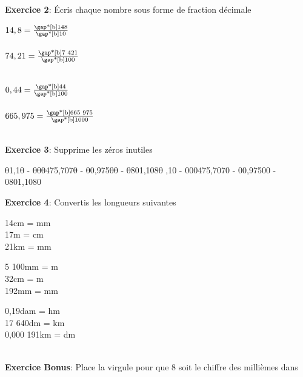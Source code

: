 \documentclass[12pt,a4paper]{article}
\begin{document}
\textbf{Exercice 2}: Écris chaque nombre sous forme de fraction décimale\\

\begin{minipage}{0.5\textwidth}
$14,8 = \frac{\text{\gap*[b]{148}}}{\text{\gap*[b]{10}}}$\\\\
$74,21 = \frac{\text{\gap*[b]{7 421}}}{\text{\gap*[b]{100}}}$\\\\
\end{minipage}
\begin{minipage}{0.5\textwidth}
$0,44 = \frac{\text{\gap*[b]{44}}}{\text{\gap*[b]{100}}}$\\\\
$665,975 = \frac{\text{\gap*[b]{665 975}}}{\text{\gap*[b]{1000}}}$\\\\
\end{minipage}

\textbf{Exercice 3}: Supprime les zéros inutiles
\begin{center}
\ifdefined\isprof
\st{0}1,1\st{0} - \st{000}475,707\st{0} - \st{0}0,975\st{00} - \st{0}801,108\st{0}
,10 - 000475,7070 - 00,97500 - 0801,1080
\fi
\end{center}

\textbf{Exercice 4}: Convertis les longueurs suivantes\\

\begin{minipage}{0.3\textwidth}
14cm = mm\\
17m = cm\\
21km = mm
\end{minipage}
\begin{minipage}{0.3\textwidth}
5 100mm = m\\
32cm = m\\
192mm = mm
\end{minipage}
\begin{minipage}{0.3\textwidth}
0,19dam = hm\\
17 640dm = km\\
0,000 191km = dm
\end{minipage}\\

\textbf{Exercice Bonus}: Place la virgule pour que 8 soit le chiffre des millièmes dans\\
\end{document}
